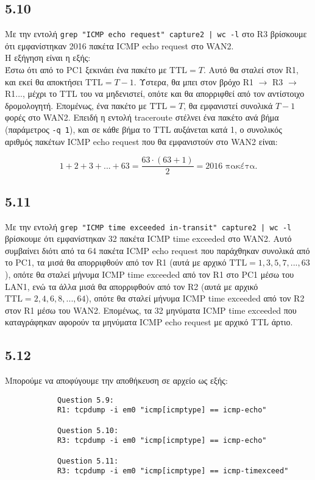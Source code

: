 \documentclass[a4paper, 12pt]{article}
\begin{document}
	\subsection*{5.10} 
		Με την εντολή \verb+grep "ICMP echo request" capture2 | wc -l+ στο R3 βρίσκουμε ότι εμφανίστηκαν 2016 πακέτα ICMP echo request στο WAN2. \\
		
		Η εξήγηση είναι η εξής: \\
		
		Έστω ότι από το PC1 ξεκινάει ένα πακέτο με $\text{TTL} = T$. Αυτό θα σταλεί στον R1, και εκεί θα αποκτήσει $\text{TTL} = T-1$. Ύστερα, θα μπει στον βρόχο R1 $\rightarrow$ R3 $\rightarrow$ R1..., μέχρι το TTL του να μηδενιστεί, οπότε και θα απορριφθεί από τον αντίστοιχο δρομολογητή. Επομένως, ένα πακέτο με $\text{TTL} = T$, θα εμφανιστεί συνολικά $T-1$ φορές στο WAN2. Επειδή η εντολή traceroute στέλνει ένα πακέτο ανά βήμα (παράμετρος \verb|-q 1|), και σε κάθε βήμα το TTL αυξάνεται κατά 1, ο συνολικός αριθμός πακέτων ICMP echo request που θα εμφανιστούν στο WAN2 είναι:
		
		\[
			1 + 2 + 3 + ... + 63 = \frac{63\cdot(63+1)}{2} = 2016 \text{ πακέτα}.
		\]

	\subsection*{5.11} 
		Με την εντολή \verb+grep "ICMP time exceeded in-transit" capture2 | wc -l+ βρίσκουμε ότι εμφανίστηκαν 32 πακέτα ICMP time exceeded στο WAN2. Αυτό συμβαίνει διότι από τα 64 πακέτα ICMP echo request που παράχθηκαν συνολικά από το PC1, τα μισά θα απορριφθούν από τον R1 (αυτά με αρχικό $\text{TTL} = 1,3,5,7,...,63$), οπότε θα σταλεί μήνυμα ICMP time exceeded από τον R1 στο PC1 μέσω του LAN1, ενώ τα άλλα μισά θα απορριφθούν από τον R2 (αυτά με αρχικό $\text{TTL} = 2,4,6,8,...,64$), οπότε θα σταλεί μήνυμα ICMP time exceeded από τον R2 στον R1 μέσω του WAN2. Επομένως, τα 32 μηνύματα ICMP time exceeded που καταγράφηκαν αφορούν τα μηνύματα ICMP echo request με αρχικό TTL άρτιο. 

	\subsection*{5.12} 
		Μπορούμε να αποφύγουμε την αποθήκευση σε αρχείο ως εξής:
		
		\begin{verbatim}
			Question 5.9:
			R1: tcpdump -i em0 "icmp[icmptype] == icmp-echo"
			
			Question 5.10:
			R3: tcpdump -i em0 "icmp[icmptype] == icmp-echo"
			
			Question 5.11:
			R3: tcpdump -i em0 "icmp[icmptype] == icmp-timexceed"
		\end{verbatim}
		
\end{document}
